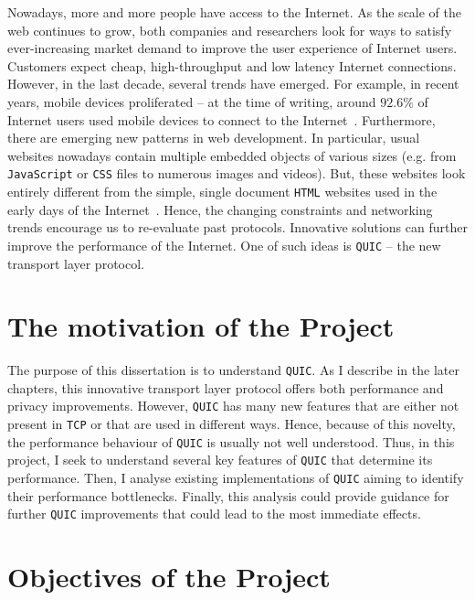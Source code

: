 \documentclass[12pt,a4paper,twoside,openright]{report}
\begin{document}
Nowadays, more and more people have access to the Internet.
As the scale of the web continues to grow, both companies and researchers look for ways to satisfy ever-increasing market demand to improve the user experience of Internet users.
Customers expect cheap, high-throughput and low latency Internet connections.
However, in the last decade, several trends have emerged.
For example, in recent years, mobile devices proliferated -- at the time of writing, around $92.6\%$ of Internet users used mobile devices to connect to the Internet~\cite{bib_number_of_mobile_users}.
Furthermore, there are emerging new patterns in web development.
In particular, usual websites nowadays contain multiple embedded objects of various sizes (e.g. from \texttt{JavaScript} or \texttt{CSS} files to numerous images and videos)\cite{bib_Netdev_0x13_QUIC_Tutorial}.
But, these websites look entirely different from the simple, single document \texttt{HTML} websites used in the early days of the Internet~\cite{RudmanRiaan2016DW3o}.
Hence, the changing constraints and networking trends encourage us to re-evaluate past protocols.
Innovative solutions can further improve the performance of the Internet. 
One of such ideas is \texttt{QUIC} -- the new transport layer protocol.

\section{The motivation of the Project}

The purpose of this dissertation is to understand \texttt{QUIC}.
As I describe in the later chapters, this innovative transport layer protocol offers both performance and privacy improvements.
However, \texttt{QUIC} has many new features that are either not present in \texttt{TCP} or that are used in different ways.
Hence, because of this novelty, the performance behaviour of \texttt{QUIC} is usually not well understood.
Thus, in this project, I seek to understand several key features of \texttt{QUIC} that determine its performance.
Then, I analyse existing implementations of \texttt{QUIC} aiming to identify their performance bottlenecks.
Finally, this analysis could provide guidance for further \texttt{QUIC} improvements that could lead to the most immediate effects.


\section{Objectives of the Project}
\end{document}
